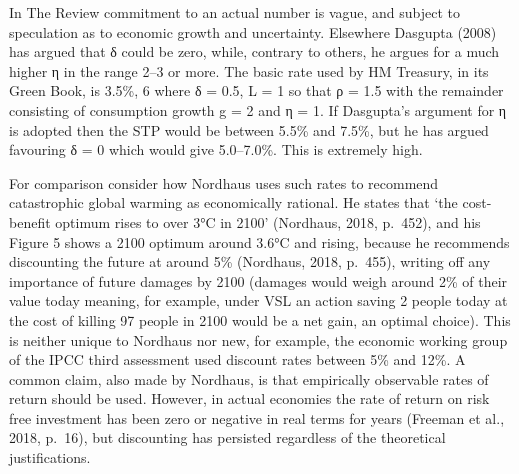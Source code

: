 \documentclass[
]{book}
\begin{document}
In The Review commitment to an actual number is vague, and subject to
speculation as to economic growth and uncertainty. Elsewhere Dasgupta (2008) has argued that δ
could be zero, while, contrary to others, he argues for a much higher η in the range 2--3 or more.
The basic rate used by HM Treasury, in its Green Book, is 3.5\%, 6 where δ = 0.5, L = 1 so
that ρ = 1.5 with the remainder consisting of consumption growth g = 2 and η = 1. If Dasgupta's
argument for η is adopted then the STP would be between 5.5\% and 7.5\%, but he has argued favouring δ =
0 which would give 5.0--7.0\%. This is extremely high.

For comparison consider how Nordhaus uses such rates to recommend catastrophic global
warming as economically rational. He states that `the cost-benefit optimum rises to over 3°C in
2100' (Nordhaus, 2018, p.~452), and his Figure 5 shows a 2100 optimum around 3.6°C and rising,
because he recommends discounting the future at around 5\% (Nordhaus, 2018, p.~455), writing off
any importance of future damages by 2100 (damages would weigh around 2\% of their value today
meaning, for example, under VSL an action saving 2 people today at the cost of killing 97 people in
2100 would be a net gain, an optimal choice). This is neither unique to Nordhaus nor new, for
example, the economic working group of the IPCC third assessment used discount rates between
5\% and 12\%. A common claim, also made by Nordhaus, is that empirically
observable rates of return should be used. However, in actual economies the rate of return on risk
free investment has been zero or negative in real terms for years (Freeman et al., 2018, p.~16), but
discounting has persisted regardless of the theoretical justifications.
\end{document}
